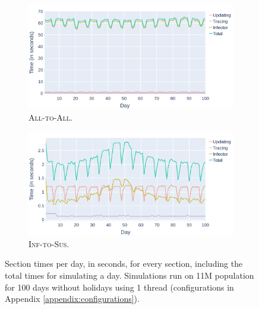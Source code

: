 \begin{figure}
    \centering
      \begin{subfigure}[b]{\linewidth}
        \centering
        \includegraphics[width=\linewidth]{3 - Stride/fig/basis_all_runtime_sections.png} 
        \caption{\textsc{All-to-All}.} 
        \label{fig:basis_all_runtime_sections} 
      \end{subfigure}
      \begin{subfigure}[b]{\linewidth}
        \centering
        \includegraphics[width=\linewidth]{3 - Stride/fig/basis_opt_runtime_sections.png} 
        \caption{\textsc{Inf-to-Sus}.} 
        \label{fig:basis_opt_runtime_sections} 
      \end{subfigure} 
      \caption{Section times per day, in seconds, for every section, including the total times for simulating a day. Simulations run on 11M population for 100 days without holidays using 1 thread (configurations in Appendix \ref{appendix:configurations}).}
      \label{fig:basis_runtime_sections} 
\end{figure}

